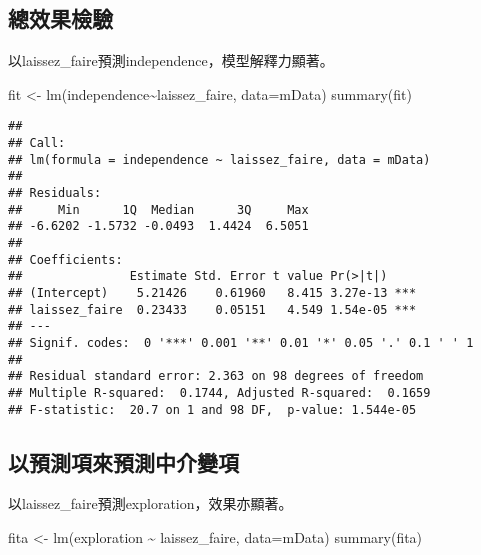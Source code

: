 \documentclass[
]{book}
\newenvironment{Shaded}{\begin{snugshade}}{\end{snugshade}}
\newcommand{\AttributeTok}[1]{\textcolor[rgb]{0.77,0.63,0.00}{#1}}
\newcommand{\FunctionTok}[1]{\textcolor[rgb]{0.00,0.00,0.00}{#1}}
\newcommand{\NormalTok}[1]{#1}
\newcommand{\OtherTok}[1]{\textcolor[rgb]{0.56,0.35,0.01}{#1}}
\newcommand{\SpecialCharTok}[1]{\textcolor[rgb]{0.00,0.00,0.00}{#1}}
\begin{document}
\hypertarget{ux7e3dux6548ux679cux6aa2ux9a57}{%
\subsection{總效果檢驗}\label{ux7e3dux6548ux679cux6aa2ux9a57}}

以laissez\_faire預測independence，模型解釋力顯著。

\begin{Shaded}
\begin{Highlighting}[]
\NormalTok{fit }\OtherTok{\textless{}{-}} \FunctionTok{lm}\NormalTok{(independence}\SpecialCharTok{\textasciitilde{}}\NormalTok{laissez\_faire, }\AttributeTok{data=}\NormalTok{mData)}
\FunctionTok{summary}\NormalTok{(fit)}
\end{Highlighting}
\end{Shaded}

\begin{verbatim}
## 
## Call:
## lm(formula = independence ~ laissez_faire, data = mData)
## 
## Residuals:
##     Min      1Q  Median      3Q     Max 
## -6.6202 -1.5732 -0.0493  1.4424  6.5051 
## 
## Coefficients:
##               Estimate Std. Error t value Pr(>|t|)    
## (Intercept)    5.21426    0.61960   8.415 3.27e-13 ***
## laissez_faire  0.23433    0.05151   4.549 1.54e-05 ***
## ---
## Signif. codes:  0 '***' 0.001 '**' 0.01 '*' 0.05 '.' 0.1 ' ' 1
## 
## Residual standard error: 2.363 on 98 degrees of freedom
## Multiple R-squared:  0.1744, Adjusted R-squared:  0.1659 
## F-statistic:  20.7 on 1 and 98 DF,  p-value: 1.544e-05
\end{verbatim}

\hypertarget{ux4ee5ux9810ux6e2cux9805ux4f86ux9810ux6e2cux4e2dux4ecbux8b8aux9805}{%
\subsection{以預測項來預測中介變項}\label{ux4ee5ux9810ux6e2cux9805ux4f86ux9810ux6e2cux4e2dux4ecbux8b8aux9805}}

以laissez\_faire預測exploration，效果亦顯著。

\begin{Shaded}
\begin{Highlighting}[]
\NormalTok{fita }\OtherTok{\textless{}{-}} \FunctionTok{lm}\NormalTok{(exploration }\SpecialCharTok{\textasciitilde{}}\NormalTok{ laissez\_faire, }\AttributeTok{data=}\NormalTok{mData)}
\FunctionTok{summary}\NormalTok{(fita)}
\end{Highlighting}
\end{Shaded}
\end{document}
